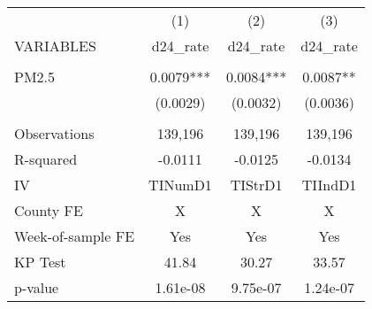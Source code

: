 \begin{tabular}{lccc} \hline
 & (1) & (2) & (3) \\
VARIABLES & d24\_rate & d24\_rate & d24\_rate \\ \hline
 &  &  &  \\
PM2.5 & 0.0079*** & 0.0084*** & 0.0087** \\
 & (0.0029) & (0.0032) & (0.0036) \\
 &  &  &  \\
Observations & 139,196 & 139,196 & 139,196 \\
R-squared & -0.0111 & -0.0125 & -0.0134 \\
IV & TINumD1 & TIStrD1 & TIIndD1 \\
County FE & X & X & X \\
Week-of-sample FE & Yes & Yes & Yes \\
KP Test & 41.84 & 30.27 & 33.57 \\
 p-value & 1.61e-08 & 9.75e-07 & 1.24e-07 \\ \hline
\end{tabular}

